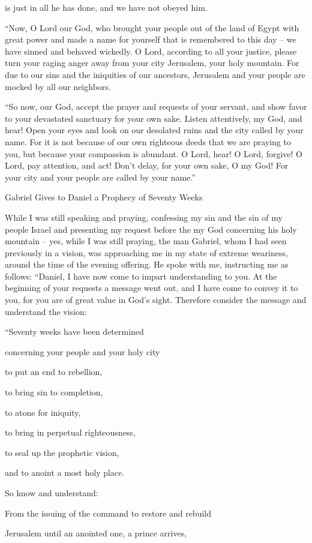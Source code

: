 {is just
in all
he has
done,
and we have not
obeyed
him.
\par }{\PP {}“Now,
O Lord
our God,
who
brought
your people
out of the land
of Egypt
with great power
and made
a name
for yourself that is remembered to this
day
– we have sinned
and behaved wickedly.
O Lord,
according to all
your justice,
please
turn
your raging anger
away from your city
Jerusalem,
your holy
mountain.
For
due to our sins and the iniquities
of our ancestors,
Jerusalem
and your people
are mocked
by all
our neighbors.
\par }{\PP {}“So now,
our God,
accept
the prayer
and requests
of your servant,
and show
favor
to
your devastated
sanctuary
for
your own sake.
Listen
attentively, my God,
and hear! Open
your eyes
and look
on our desolated
ruins and the city
called
by your name.
For
it
is not
because of our own righteous
deeds that we
are praying
to you, but because
your compassion
is abundant.
O Lord,
hear! O Lord,
forgive! O Lord,
pay attention,
and act! Don’t
delay,
for your own sake,
O my God! For
your city
and your people
are called
by your name.”
\par }{\SH Gabriel Gives to Daniel a Prophecy of Seventy Weeks
\par }{\PP {}While
I
was still speaking
and praying,
confessing
my sin
and the sin
of my people
Israel
and presenting
my request
before
the
{}
my God
concerning
his holy
mountain –
yes, while
I
was still praying,
the man
Gabriel,
whom
I had seen
previously
in a vision,
was approaching
me in my state of extreme
weariness,
around the time
of the evening
offering.
He spoke
with
me, instructing
me as follows: “Daniel,
I have now
come
to impart
understanding to you.
At the beginning
of your requests
a message
went out,
and I
have come
to convey
it to you,
for you are of great value in God’s sight. Therefore consider
the message
and understand
the vision:
\par }{\Q {}“Seventy
weeks
have been determined
\par }{\Q concerning
your people
and your holy
city
\par }{\Q to put an end to rebellion,
\par }{\Q to bring
sin
to completion,

\par }{\Q to atone for
iniquity,
\par }{\Q to bring
in perpetual
righteousness,
\par }{\Q to seal
up the prophetic
vision,
\par }{\Q and to anoint
a most
holy place.
\par }{\Q {}So know
and understand:
\par }{\Q From
the issuing
of the command
to restore
and rebuild
\par }{\Q Jerusalem
until
an anointed one,
a prince
arrives,

}
